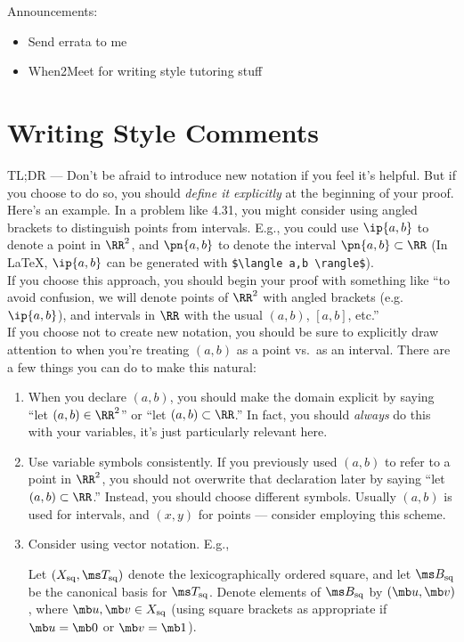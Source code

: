 \documentclass{fkpset}
\begin{document}
Announcements:
\begin{itemize}
  \item Send errata to me
  \item When2Meet for writing style tutoring stuff
\end{itemize}

\section{Writing Style Comments}
\begin{problem}[A1]
  TL;DR --- Don't be afraid to introduce new notation if you feel it's helpful.
  But if you choose to do so, you should \emph{define it explicitly} at the
  beginning of your proof.\\

  Here's an example. In a problem like 4.31, you might consider using angled
  brackets to distinguish points from intervals. E.g., you could use $\ip{a,b}$
  to denote a point in $\RR^2$, and $\pn{a,b}$ to denote the interval $\pn{a,b}
  \subset \RR$ (In \LaTeX, $\ip{a,b}$ can be generated with
  \verb|$\langle a,b \rangle$|).\\

  If you choose this approach, you should begin your proof with something like
  ``to avoid confusion, we will denote points of $\RR^2$ with angled brackets
  (e.g.\ $\ip{a,b}$), and intervals in $\RR$ with the usual $(a,b)$, $[a,b]$,
  etc.'' \\

  If you choose not to create new notation, you should be sure to explicitly
  draw attention to when you're treating $(a,b)$ as a point vs.\ as an interval.
  There are a few things you can do to make this natural:\\[-.75em]
  \begin{enumerate}[label=(\arabic*)]
    \item When you declare $(a,b)$, you should make the domain explicit by
      saying ``let $(a,b) \in \RR^2$'' or ``let $(a,b) \subset \RR$.'' In fact,
      you should \emph{always} do this with your variables, it's just
      particularly relevant here.
    \item Use variable symbols consistently. If you previously used $(a,b)$ to
      refer to a point in $\RR^2$, you should not overwrite that declaration
      later by saying ``let $(a,b) \subset \RR$.'' Instead, you should choose
      different symbols. Usually $(a,b)$ is used for intervals, and $(x,y)$ for
      points --- consider employing this scheme.
    \item Consider using vector notation. E.g.,
      \begin{leftbar}
        Let $(X_{\rm sq}, \ms T_{\rm sq})$ denote the lexicographically ordered
        square, and let $\ms B_{\rm sq}$ be the canonical basis for $\ms T_{\rm
          sq}$. Denote elements of $\ms B_{\rm sq}$ by $(\mb u, \mb v)$, where
        $\mb u, \mb v \in X_{\rm sq}$ (using square brackets as appropriate if
        $\mb u = \mb 0$ or $\mb v = \mb 1$).
      \end{leftbar}
  \end{enumerate}
\end{problem}
\end{document}
